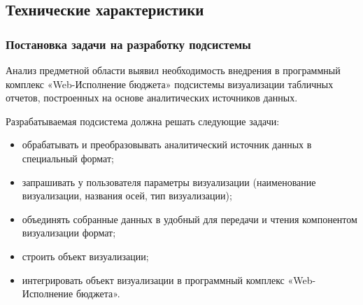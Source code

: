 \documentclass[a4paper]{extarticle}
\begin{document}
\subsection{Технические характеристики}

\subsubsection{Постановка задачи на разработку подсистемы}
Анализ предметной области выявил необходимость внедрения в программный комплекс «Web-Исполнение бюджета» подсистемы визуализации табличных отчетов, построенных на основе аналитических источников данных.\par
Разрабатываемая подсистема должна решать следующие задачи:
\begin{itemize}
  \item обрабатывать и преобразовывать аналитический источник данных в специальный формат;
  \item запрашивать у пользователя параметры визуализации (наименование визуализации, названия осей, тип визуализации);
  \item объединять собранные данных в удобный для передачи и чтения компонентом визуализации формат;
  \item строить объект визуализации;
  \item интегрировать объект визуализации в программный комплекс «Web-Исполнение бюджета».
\end{itemize}\par
\end{document}
